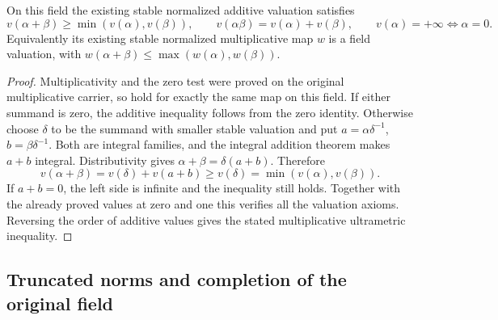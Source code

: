 \begin{theorem}
\label{fw:norm-limit-field-valuation}
\leanok
On this field the existing stable normalized additive valuation satisfies
\[
 v(\alpha+\beta)\geq\min(v(\alpha),v(\beta)),\qquad
 v(\alpha\beta)=v(\alpha)+v(\beta),\qquad
 v(\alpha)=+\infty\Longleftrightarrow\alpha=0.
\]
Equivalently its existing stable normalized multiplicative map $w$
is a field valuation, with
$w(\alpha+\beta)\leq\max(w(\alpha),w(\beta))$.
\end{theorem}
\begin{proof}
Multiplicativity and the zero test were proved on the original
multiplicative carrier, so hold for exactly the same map on this field.
If either summand is zero, the additive inequality follows from the zero
identity. Otherwise choose $\delta$ to be the summand with smaller
stable valuation and put $a=\alpha\delta^{-1}$,
$b=\beta\delta^{-1}$. Both are integral families, and the integral
addition theorem makes $a+b$ integral. Distributivity gives
$\alpha+\beta=\delta(a+b)$. Therefore
\[
 v(\alpha+\beta)=v(\delta)+v(a+b)
 \geq v(\delta)=\min(v(\alpha),v(\beta)).
\]
If $a+b=0$, the left side is infinite and the inequality still holds.
Together with the already proved values at zero and one this verifies
all the valuation axioms. Reversing the order of additive values gives
the stated multiplicative ultrametric inequality.
\end{proof}

\subsection{Truncated norms and completion of the original field}


